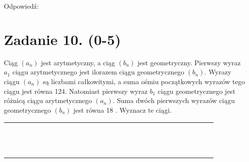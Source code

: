 \documentclass[10pt]{article}
\begin{document}
Odpowiedź:

\section*{Zadanie 10. (0-5)}
Ciąg \(\left(a_{n}\right)\) jest arytmetyczny, a ciąg \(\left(b_{n}\right)\) jest geometryczny. Pierwszy wyraz \(a_{1}\) ciągu arytmetycznego jest ilorazem ciągu geometrycznego \(\left(b_{n}\right)\). Wyrazy ciągu \(\left(a_{n}\right)\) są liczbami całkowitymi, a suma ośmiu początkowych wyrazów tego ciągu jest równa 124. Natomiast pierwszy wyraz \(b_{1}\) ciągu geometrycznego jest różnicą ciągu arytmetycznego \(\left(a_{n}\right)\). Suma dwóch pierwszych wyrazów ciągu geometrycznego \(\left(b_{n}\right)\) jest równa 18 . Wyznacz te ciągi.

\begin{center}
\begin{tabular}{|c|c|c|c|c|c|c|c|c|c|c|c|c|c|c|c|c|c|c|c|c|c|c|c|c|c|c|}
\hline
 &  &  &  &  &  &  &  &  &  &  &  &  &  &  &  &  &  &  &  &  &  &  &  &  &  &  \\
\hline
 &  &  &  &  &  &  &  &  &  &  &  &  &  &  &  &  &  &  &  &  &  &  &  &  &  &  \\
\hline
 &  &  &  &  &  &  &  &  &  &  &  &  &  &  &  &  &  &  &  &  &  &  &  &  &  &  \\
\hline
 &  &  &  &  &  &  &  &  &  &  &  &  &  &  &  &  &  &  &  &  &  &  &  &  &  &  \\
\hline
 &  &  &  &  &  &  &  &  &  &  &  &  &  &  &  &  &  &  &  &  &  &  &  &  &  &  \\
\hline
 &  &  &  &  &  &  &  &  &  &  &  &  &  &  &  &  &  &  &  &  &  &  &  &  &  &  \\
\hline
 &  &  &  &  &  &  &  &  &  &  &  &  &  &  &  &  &  &  &  &  &  &  &  &  &  &  \\
\hline
 &  &  &  &  &  &  &  &  &  &  &  &  &  &  &  &  &  &  &  &  &  &  &  &  &  &  \\
\hline
 &  &  &  &  &  &  &  &  &  &  &  &  &  &  &  &  &  &  &  &  &  &  &  &  &  &  \\
\hline
 &  &  &  &  &  &  &  &  &  &  &  &  &  &  &  &  &  &  &  &  &  &  &  &  &  &  \\
\hline
 &  &  &  &  &  &  &  &  &  &  &  &  &  &  &  &  &  &  &  &  &  &  &  &  &  &  \\
\hline
 &  &  &  &  &  &  &  &  &  &  &  &  &  &  &  &  &  &  &  &  &  &  &  &  &  &  \\
\hline
 &  &  &  &  &  &  &  &  &  &  &  &  &  &  &  &  &  &  &  &  &  &  &  &  &  &  \\

\end{tabular}
\end{center}
\end{document}
